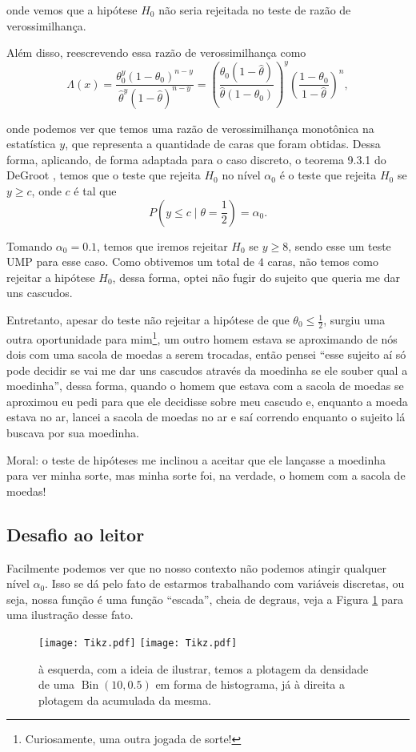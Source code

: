 \documentclass{article}
\begin{document}
\noindent onde vemos que a hipótese $H_0$ não seria rejeitada no teste de razão de verossimilhança.

Além disso, reescrevendo essa razão de verossimilhança como 
\[\Lambda(x) = \dfrac{\theta_0^y(1 - \theta_0)^{n - y}}{\hat{\theta}^y(1 - \hat{\theta})^{n - y}} = \left(\dfrac{\theta_0\left(1 - \hat{\theta}\right)}{\hat{\theta}\left(1 - \theta_0\right)}\right)^y \left(\dfrac{1 - \theta_0}{1 - \hat{\theta}}\right)^n,\]

\noindent onde podemos ver que temos uma razão de verossimilhança monotônica na estatística $y$, que representa a quantidade de caras que foram obtidas. Dessa forma, aplicando, de forma adaptada para o caso discreto, o teorema 9.3.1 do DeGroot \cite{degroot}, temos que o teste que rejeita $H_0$ no nível $\alpha_0$ é o teste que rejeita $H_0$ se $y \geq c$, onde $c$ é tal que
\[P\left(y \leq c \mid \theta = \dfrac{1}{2}\right) = \alpha_0.\]

Tomando $\alpha_0 = 0.1$, temos que iremos rejeitar $H_0$ se $y \geq 8$, sendo esse um teste UMP para esse caso. Como obtivemos um total de $4$ caras, não temos como rejeitar a hipótese $H_0$, dessa forma, optei não fugir do sujeito que queria me dar uns cascudos.

Entretanto, apesar do teste não rejeitar a hipótese de que $\theta_0 \leq \frac{1}{2}$, surgiu uma outra oportunidade para mim\footnote{Curiosamente, uma outra jogada de sorte!}, um outro homem estava se aproximando de nós dois com uma sacola de moedas a serem trocadas, então pensei ``esse sujeito aí só pode decidir se vai me dar uns cascudos através da moedinha se ele souber qual a moedinha'', dessa forma, quando o homem que estava com a sacola de moedas se aproximou eu pedi para que ele decidisse sobre meu cascudo e, enquanto a moeda estava no ar, lancei a sacola de moedas no ar e saí correndo enquanto o sujeito lá buscava por sua moedinha.

Moral: o teste de hipóteses me inclinou a aceitar que ele lançasse a moedinha para ver minha sorte, mas minha sorte foi, na verdade, o homem com a sacola de moedas!

\subsection*{Desafio ao leitor}

Facilmente podemos ver que no nosso contexto não podemos atingir qualquer nível $\alpha_0$. Isso se dá pelo fato de estarmos trabalhando com variáveis discretas, ou seja, nossa função é uma função ``escada'', cheia de degraus, veja a Figura \ref{binomial} para uma ilustração desse fato.
\begin{figure}
    \texttt{[image: Tikz.pdf]}
    \texttt{[image: Tikz.pdf]}
    \caption{à esquerda, com a ideia de ilustrar, temos a plotagem da densidade de uma $\operatorname{Bin}(10, 0.5)$ em forma de histograma, já à direita a plotagem da acumulada da mesma.}
    \label{binomial}
\end{figure}
\end{document}
